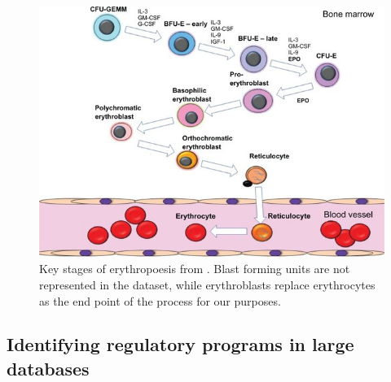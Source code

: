 \begin{figure}
  \centering
  \includegraphics[width=\textwidth]{plot/ch4/ery}
  \caption[Erythropoiesis schematic]{Key stages of erythropoesis from \textcite{Sinclair2013}. Blast forming units are not represented in the \textcite{Ludwig2019} dataset, while erythroblasts replace erythrocytes as the end point of the process for our purposes.}
  \label{fig:ery}
\end{figure}





\subsection{Identifying regulatory programs in large databases}


